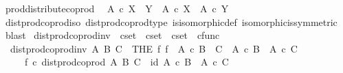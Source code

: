 \begin{isabellebody}
\begin{isamarkuptext}
\end{isamarkuptext}\isamarkuptrue%
\isamarkupfalse%
\ prod{\isacharunderscore}{\kern0pt}distribute{\isacharunderscore}{\kern0pt}coprod{\isacharcolon}{\kern0pt}\isanewline
\ \ {\isachardoublequoteopen}A\ {\isasymtimes}\isactrlsub c\ {\isacharparenleft}{\kern0pt}X\ {\isasymCoprod}\ Y{\isacharparenright}{\kern0pt}\ {\isasymcong}\ {\isacharparenleft}{\kern0pt}A\ {\isasymtimes}\isactrlsub c\ X{\isacharparenright}{\kern0pt}\ {\isasymCoprod}\ {\isacharparenleft}{\kern0pt}A\ {\isasymtimes}\isactrlsub c\ Y{\isacharparenright}{\kern0pt}{\isachardoublequoteclose}\isanewline
%
\isadelimproof
\ \ %
\endisadelimproof
%
\isatagproof
{}\isamarkupfalse%
\ dist{\isacharunderscore}{\kern0pt}prod{\isacharunderscore}{\kern0pt}coprod{\isacharunderscore}{\kern0pt}iso\ dist{\isacharunderscore}{\kern0pt}prod{\isacharunderscore}{\kern0pt}coprod{\isacharunderscore}{\kern0pt}type\ is{\isacharunderscore}{\kern0pt}isomorphic{\isacharunderscore}{\kern0pt}def\ isomorphic{\isacharunderscore}{\kern0pt}is{\isacharunderscore}{\kern0pt}symmetric\ \isamarkupfalse%
\ blast%
\endisatagproof
{\isafoldproof}%
%
\isadelimproof
%
\endisadelimproof
%
\isadelimdocument
%
\endisadelimdocument
%
\isatagdocument
%
\isamarkuptrue%
%
\endisatagdocument
{\isafolddocument}%
%
\isadelimdocument
%
\endisadelimdocument
{}\isamarkupfalse%
\ dist{\isacharunderscore}{\kern0pt}prod{\isacharunderscore}{\kern0pt}coprod{\isacharunderscore}{\kern0pt}inv\ {\isacharcolon}{\kern0pt}{\isacharcolon}{\kern0pt}\ {\isachardoublequoteopen}cset\ {\isasymRightarrow}\ cset\ {\isasymRightarrow}\ cset\ {\isasymRightarrow}\ cfunc{\isachardoublequoteclose}\ \isanewline
\ \ {\isachardoublequoteopen}dist{\isacharunderscore}{\kern0pt}prod{\isacharunderscore}{\kern0pt}coprod{\isacharunderscore}{\kern0pt}inv\ A\ B\ C\ {\isacharequal}{\kern0pt}\ {\isacharparenleft}{\kern0pt}THE\ f{\isachardot}{\kern0pt}\ f\ {\isacharcolon}{\kern0pt}\ A\ {\isasymtimes}\isactrlsub c\ {\isacharparenleft}{\kern0pt}B\ {\isasymCoprod}\ C{\isacharparenright}{\kern0pt}\ {\isasymrightarrow}\ {\isacharparenleft}{\kern0pt}A\ {\isasymtimes}\isactrlsub c\ B{\isacharparenright}{\kern0pt}\ {\isasymCoprod}\ {\isacharparenleft}{\kern0pt}A\ {\isasymtimes}\isactrlsub c\ C{\isacharparenright}{\kern0pt}\isanewline
\ \ \ \ {\isasymand}\ f\ {\isasymcirc}\isactrlsub c\ dist{\isacharunderscore}{\kern0pt}prod{\isacharunderscore}{\kern0pt}coprod\ A\ B\ C\ {\isacharequal}{\kern0pt}\ id\ {\isacharparenleft}{\kern0pt}{\isacharparenleft}{\kern0pt}A\ {\isasymtimes}\isactrlsub c\ B{\isacharparenright}{\kern0pt}\ {\isasymCoprod}\ {\isacharparenleft}{\kern0pt}A\ {\isasymtimes}\isactrlsub c\ C{\isacharparenright}{\kern0pt}{\isacharparenright}{\kern0pt}\isanewline

\end{isabellebody}
